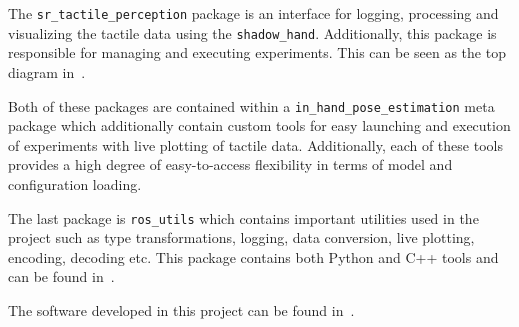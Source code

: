 The \texttt{sr\_tactile\_perception} package is an interface for logging, processing and visualizing the tactile data using the \texttt{shadow\_hand}. Additionally, this package is responsible for managing and executing experiments. This can be seen as the top diagram in~. \medskip

Both of these packages are contained within a \texttt{in\_hand\_pose\_estimation} meta package which additionally contain custom tools for easy launching and execution of experiments with live plotting of tactile data. Additionally, each of these tools provides a high degree of easy-to-access flexibility in terms of model and configuration loading.\medskip

The last package is \texttt{ros\_utils} which contains important utilities used in the project such as type transformations, logging, data conversion, live plotting, encoding, decoding etc. This package contains both Python and C++ tools and can be found in~\cite{ros-utils-repo}.\medskip

The software developed in this project can be found in~\cite{in-hand-pose-estimation-repo}.




